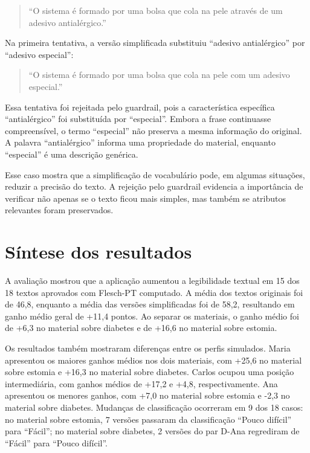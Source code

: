 \begin{quote}
``O sistema é formado por uma bolsa que cola na pele através de um adesivo antialérgico.''
\end{quote}

Na primeira tentativa, a versão simplificada substituiu ``adesivo antialérgico'' por ``adesivo especial'':

\begin{quote}
``O sistema é formado por uma bolsa que cola na pele com um adesivo especial.''
\end{quote}

Essa tentativa foi rejeitada pelo guardrail, pois a característica específica ``antialérgico'' foi substituída por ``especial''. Embora a frase continuasse compreensível, o termo ``especial'' não preserva a mesma informação do original. A palavra ``antialérgico'' informa uma propriedade do material, enquanto ``especial'' é uma descrição genérica.

Esse caso mostra que a simplificação de vocabulário pode, em algumas situações, reduzir a precisão do texto. A rejeição pelo guardrail evidencia a importância de verificar não apenas se o texto ficou mais simples, mas também se atributos relevantes foram preservados.

\section{Síntese dos resultados}
\label{sec:sintese-resultados-avaliacao}

A avaliação mostrou que a aplicação aumentou a legibilidade textual em 15 dos 18 textos aprovados com Flesch-PT computado. A média dos textos originais foi de 46,8, enquanto a média das versões simplificadas foi de 58,2, resultando em ganho médio geral de +11,4 pontos. Ao separar os materiais, o ganho médio foi de +6,3 no material sobre diabetes e de +16,6 no material sobre estomia.

Os resultados também mostraram diferenças entre os perfis simulados. Maria apresentou os maiores ganhos médios nos dois materiais, com +25,6 no material sobre estomia e +16,3 no material sobre diabetes. Carlos ocupou uma posição intermediária, com ganhos médios de +17,2 e +4,8, respectivamente. Ana apresentou os menores ganhos, com +7,0 no material sobre estomia e -2,3 no material sobre diabetes. Mudanças de classificação ocorreram em 9 dos 18 casos: no material sobre estomia, 7 versões passaram da classificação ``Pouco difícil'' para ``Fácil''; no material sobre diabetes, 2 versões do par D-Ana regrediram de ``Fácil'' para ``Pouco difícil''.

